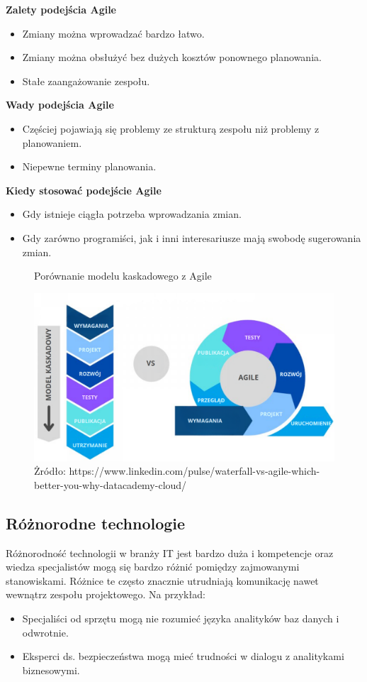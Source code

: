 \textbf{Zalety podejścia Agile}
\begin{itemize}
    \item Zmiany można wprowadzać bardzo łatwo.
    \item Zmiany można obsłużyć bez dużych kosztów ponownego planowania.
    \item Stałe zaangażowanie zespołu.
\end{itemize}

\textbf{Wady podejścia Agile}
\begin{itemize}
    \item Częściej pojawiają się problemy ze strukturą zespołu niż problemy z planowaniem.
    \item Niepewne terminy planowania.
\end{itemize}

\textbf{Kiedy stosować podejście Agile}
\begin{itemize}
    \item Gdy istnieje ciągła potrzeba wprowadzania zmian.
    \item Gdy zarówno programiści, jak i inni interesariusze mają swobodę sugerowania zmian.\autocite{arora2016analysis}
\end{itemize}

\begin{figure}
    \centering
    \caption{Porównanie modelu kaskadowego z Agile}
    \includegraphics[width=1\linewidth]{img/waterfall_agile_PL.png}
    \caption*{Żródło: https://www.linkedin.com/pulse/waterfall-vs-agile-which-better-you-why-datacademy-cloud/}
\end{figure}

\subsection{Różnorodne technologie}
Różnorodność technologii w branży IT jest bardzo duża i kompetencje oraz wiedza specjalistów mogą się bardzo różnić pomiędzy zajmowanymi stanowiskami. 
Różnice te często znacznie utrudniają komunikację nawet wewnątrz zespołu projektowego. Na przykład:
\begin{itemize}
    \item Specjaliści od sprzętu mogą nie rozumieć języka analityków baz danych i odwrotnie.
    \item Eksperci ds. bezpieczeństwa mogą mieć trudności w dialogu z analitykami biznesowymi.
\end{itemize}

